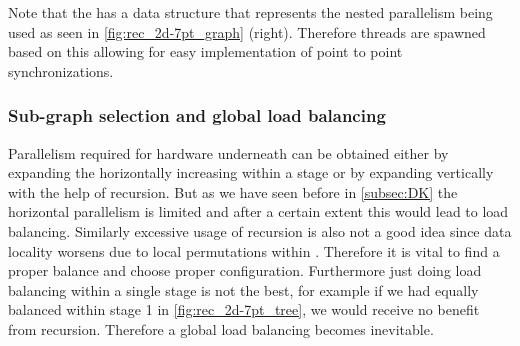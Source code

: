  Note that the \levelTree has a data structure that represents the nested parallelism being used as seen in \cref{fig:rec_2d-7pt_graph} (right). Therefore threads are spawned based on this \levelTree allowing for easy implementation of point to point synchronizations.

\subsubsection{Sub-graph selection and global load balancing} \label{subsec:subgraph_selection}
Parallelism required for hardware underneath can be obtained either by expanding the \levelTree horizontally \ie increasing \levelGroups within a stage or by expanding \levelTree vertically with the help of recursion. But as we have seen before in \cref{subsec:DK} the horizontal parallelism is limited and after a certain extent this would lead to load balancing. Similarly excessive usage of recursion is also not a good idea since data locality worsens due to local permutations within \subgraph. Therefore it is vital to find a proper balance and choose proper configuration. Furthermore just doing load balancing within a single stage is not the best, for example if we had equally balanced within stage 1 in \cref{fig:rec_2d-7pt_tree}, we would receive no benefit from recursion. Therefore a global load balancing becomes inevitable.

